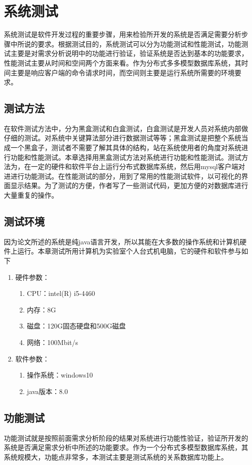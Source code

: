 
\chapter{系统测试}
系统测试是软件开发过程的重要步骤，用来检验所开发的系统是否满足需要分析步骤中所说的要求。根据测试目的，系统测试可以分为功能测试和性能测试，功能测试主要是对需求分析说明中的功能进行验证，验证系统是否达到基本的功能要求，性能测试主要从时间和空间两个方面来看。作为分布式多多模型数据库系统，其时间主要是响应客户端的命令请求时间，而空间则主要是运行系统所需要的环境要求。
\section{测试方法}
在软件测试方法中，分为黑盒测试和白盒测试，白盒测试是开发人员对系统内部做仔细的测试。对系统中关键算法部分进行数据测试等等；黑盒测试是把整个系统当成一个黑盒子，测试者不需要了解其具体的结构，站在系统使用者的角度对系统进行功能和性能测试。本章选择用黑盒测试方法对系统进行功能和性能测试。测试方法为，在一定的硬件和软件平台上运行分布式数据库系统，然后用mysql客户端对进进行功能测试。在性能测试的部分，用到了常用的性能测试软件，以可视化的界面显示结果。为了测试的方便，作者写了一些测试代码，更加方便的对数据库进行大量重复的操作。
\section{测试环境}
因为论文所述的系统是纯java语言开发，所以其能在大多数的操作系统和计算机硬件上运行。本章测试所用计算机为实验室个人台式机电脑，它的硬件和软件参与如下
\begin{enumerate}
	\item 硬件参数：
	\begin{enumerate}
		\item CPU：intel(R) i5-4460
		\item 内存：8G
		\item 磁盘：120G固态硬盘和500G磁盘
		\item 网络：100Mbit/s
	\end{enumerate}
\item 软件参数：
\begin{enumerate}
	\item 操作系统：windows10
	\item java版本：8.0
\end{enumerate}
\end{enumerate}
\section{功能测试}
功能测试就是按照前面需求分析阶段的结果对系统进行功能性验证，验证所开发的系统是否满足需求分析中所述的功能要求。作为一个分布式多模型数据库系统，其系统规模大，功能点非常多，本测试主要是测试系统的关系数据库功能上。
